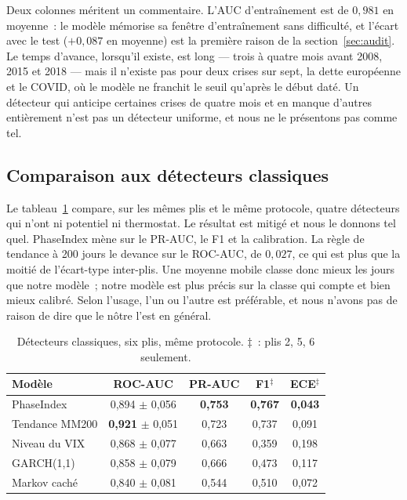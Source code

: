 \documentclass[11pt,a4paper]{article}
\begin{document}
Deux colonnes méritent un commentaire. L'AUC d'entraînement est de $0{,}981$ en moyenne~: le modèle mémorise sa fenêtre d'entraînement sans difficulté, et l'écart avec le test ($+0{,}087$ en moyenne) est la première raison de la section~\ref{sec:audit}. Le temps d'avance, lorsqu'il existe, est long --- trois à quatre mois avant 2008, 2015 et 2018 --- mais il n'existe pas pour deux crises sur sept, la dette européenne et le COVID, où le modèle ne franchit le seuil qu'après le début daté. Un détecteur qui anticipe certaines crises de quatre mois et en manque d'autres entièrement n'est pas un détecteur uniforme, et nous ne le présentons pas comme tel.

\subsection{Comparaison aux détecteurs classiques}

Le tableau~\ref{tab:baselines} compare, sur les mêmes plis et le même protocole, quatre détecteurs qui n'ont ni potentiel ni thermostat. Le résultat est mitigé et nous le donnons tel quel. PhaseIndex mène sur le PR-AUC, le F1 et la calibration. La règle de tendance à 200 jours le devance sur le ROC-AUC, de $0{,}027$, ce qui est plus que la moitié de l'écart-type inter-plis. Une moyenne mobile classe donc mieux les jours que notre modèle~; notre modèle est plus précis sur la classe qui compte et bien mieux calibré. Selon l'usage, l'un ou l'autre est préférable, et nous n'avons pas de raison de dire que le nôtre l'est en général.

\begin{table}[htbp]
\centering\small
\caption{Détecteurs classiques, six plis, même protocole. $\ddagger$~: plis 2, 5, 6 seulement.}
\label{tab:baselines}
\begin{tabular}{lcccc}
\toprule
Modèle & ROC-AUC & PR-AUC & F1$^\ddagger$ & ECE$^\ddagger$ \\
\midrule
PhaseIndex & 0,894 $\pm$ 0,056 & \textbf{0,753} & \textbf{0,767} & \textbf{0,043} \\
Tendance MM200 & \textbf{0,921} $\pm$ 0,051 & 0,723 & 0,737 & 0,091 \\
Niveau du VIX & 0,868 $\pm$ 0,077 & 0,663 & 0,359 & 0,198 \\
GARCH(1,1) & 0,858 $\pm$ 0,079 & 0,666 & 0,473 & 0,117 \\
Markov caché & 0,840 $\pm$ 0,081 & 0,544 & 0,510 & 0,072 \\
\bottomrule
\end{tabular}
\end{table}
\end{document}
